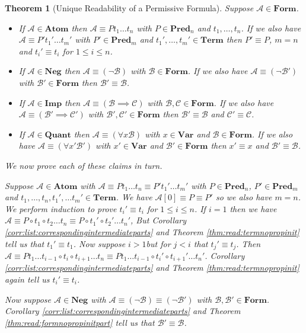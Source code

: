 \documentclass[12pt]{article}
\theoremstyle{break}
\theoremstyle{break}
\newtheorem{theorem}{Theorem}[section]
\theoremstyle{break}
\theoremstyle{break}
\theoremstyle{break}
\newtheorem{informal definition}[definition]{Informal Definition}
\newcommand{\mc}[1]{\mathcal{#1}}
\begin{document}
\begin{theorem}[Unique Readability of a Permissive Formula]
Suppose $\mc{A}\in\textbf{Form}$.
\begin{itemize}
\item{If $\mc{A}\in\textbf{Atom}$ then $\mc{A}\equiv Pt_1\ldots t_n$ with $P\in\textbf{Pred}_n$ and $t_1,\ldots, t_n$. If we also have $\mc{A}\equiv P' t_1'\ldots t_m'$ with $P'\in\textbf{Pred}_m$ and $t_1',\ldots,t_m'\in\textbf{Term}$ then $P' \equiv P$, $m=n$ and $t_i'\equiv t_i$ for $1\le i \le n$.}
\item{If $\mc{A}\in\textbf{Neg}$ then $\mc{A}\equiv (\lnot \mc{B})$ with $\mc{B}\in\textbf{Form}$. If we also have $\mc{A}\equiv (\lnot \mc{B}')$ with $\mc{B}'\in\textbf{Form}$ then $\mc{B}'\equiv \mc{B}$.}
\item{If $\mc{A}\in\textbf{Imp}$ then $\mc{A}\equiv (\mc{B}\implies \mc{C})$ with $\mc{B},\mc{C}\in\textbf{Form}$. If we also have $\mc{A}\equiv (\mc{B}'\implies \mc{C}')$ with $\mc{B}', \mc{C}'\in\textbf{Form}$ then $\mc{B}'\equiv \mc{B}$ and $\mc{C}'\equiv \mc{C}$.}
\item{If $\mc{A}\in\textbf{Quant}$ then $\mc{A}\equiv (\forall x \mc{B})$ with $x\in\textbf{Var}$ and $\mc{B}\in\textbf{Form}$. If we also have $\mc{A}\equiv (\forall x' \mc{B}')$ with $x'\in\textbf{Var}$ and $\mc{B}'\in\textbf{Form}$ then $x'\equiv x$ and $\mc{B}'\equiv \mc{B}$.}
\end{itemize}
We now prove each of these claims in turn.

Suppose $\mc{A}\in\textbf{Atom}$ with $\mc{A}\equiv Pt_1\ldots t_n\equiv P't_1'\ldots t_m'$ with $P\in\textbf{Pred}_n$, $P'\in\textbf{Pred}_m$ and $t_1,\ldots,t_n,t_1',\ldots t_m'\in\textbf{Term}$.
We have $\mc{A}[0]\equiv P\equiv P'$ so we also have $m=n$.
We perform induction to prove $t_i'\equiv t_i$ for $1\le i \le n$.
If $i=1$ then we have $\mc{A}\equiv P\circ t_1 \circ t_2\ldots t_n \equiv P\circ t_1' \circ t_2'\ldots t_n'$, But Corollary \ref{corr:list:correspondingintermediateparts} and Theorem \ref{thm:read:termnopropinit} tell us that $t_1'\equiv t_1$.
Now suppose $i > 1$but for $j<i$ that $t_j'\equiv t_j$.
Then $\mc{A}\equiv Pt_1\ldots t_{i-1} \circ t_i \circ t_{i+1} \ldots t_n \equiv Pt_1\ldots t_{i-1}\circ t_i' \circ t_{i+1}' \ldots t_n'$.
Corollary \ref{corr:list:correspondingintermediateparts} and Theorem \ref{thm:read:termnopropinit} again tell us $t_i'\equiv t_i$.

Now suppose $\mc{A}\in \textbf{Neg}$ with $\mc{A}\equiv (\lnot \mc{B}) \equiv (\lnot \mc{B}')$ with $\mc{B}, \mc{B}'\in\textbf{Form}$.
Corollary \ref{corr:list:correspondingintermediateparts} and Theorem \ref{thm:read:formnopropinitpart} tell us that $\mc{B}'\equiv \mc{B}$.


\end{theorem}
\end{document}
